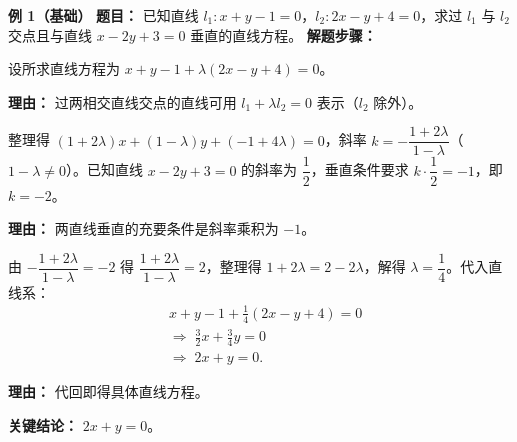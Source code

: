 \begin{examplebox}
	\textbf{\textcolor{CExample}{例 1（基础）}}
	\textbf{\textcolor{CExample}{题目：}}
	已知直线 $l_1: x+y-1=0$，$l_2: 2x-y+4=0$，求过 $l_1$ 与 $l_2$ 交点且与直线 $x-2y+3=0$ 垂直的直线方程。
	\textbf{\textcolor{CExample}{解题步骤：}}
	\begin{description}[style=nextline, leftmargin=2.8em, labelsep=0.5em, itemsep=0.45em]
		\item[\textbf{第一步（设直线系）：}]
			设所求直线方程为 $x+y-1+\lambda(2x-y+4)=0$。
			\par\textbf{理由：} 过两相交直线交点的直线可用 $l_1+\lambda l_2=0$ 表示（$l_2$ 除外）。
		\item[\textbf{第二步（列垂直条件）：}]
			整理得 $(1+2\lambda)x+(1-\lambda)y+(-1+4\lambda)=0$，斜率 $k=-\dfrac{1+2\lambda}{1-\lambda}$（$1-\lambda\neq0$）。已知直线 $x-2y+3=0$ 的斜率为 $\dfrac12$，垂直条件要求 $k\cdot\dfrac12=-1$，即 $k=-2$。
			\par\textbf{理由：} 两直线垂直的充要条件是斜率乘积为 $-1$。
		\item[\textbf{第三步（解 $\lambda$ 并回代）：}]
			由 $-\dfrac{1+2\lambda}{1-\lambda}=-2$ 得 $\dfrac{1+2\lambda}{1-\lambda}=2$，整理得 $1+2\lambda=2-2\lambda$，解得 $\lambda=\dfrac14$。代入直线系：
			\[
				\begin{aligned}
					& x+y-1+\frac14(2x-y+4)=0 \\ & \Longrightarrow\; \frac32x+\frac34y=0 \\ & \Longrightarrow\; 2x+y=0 .
			\end{aligned}
			\]
			\par\textbf{理由：} 代回即得具体直线方程。
	\end{description}
	\textbf{\textcolor{CExample}{关键结论：}}
	$\boxed{2x+y=0}$。


\end{examplebox}
